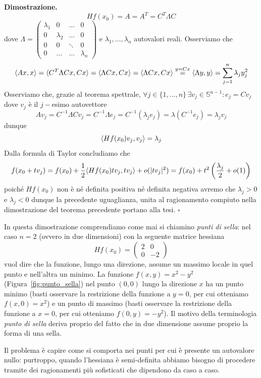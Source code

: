 \noindent \textbf{Dimostrazione. }
$$
Hf(x_0)=A=A^T=C^T \Lambda C
$$
dove $\Lambda = \begin{pmatrix} \lambda_1 & 0 & \ldots & 0 \\
0 & \lambda_2 & \ldots & 0 \\
0 & 0 & \ddots & 0 \\ 0 & \ldots & \ldots & \lambda_n \end{pmatrix}$ e $\lambda_1, \ldots, \lambda_n$ autovalori reali. Osserviamo che
$$
\langle Ax, x \rangle = \langle C^T \Lambda Cx, Cx \rangle = \langle \Lambda Cx, Cx \rangle =  \langle \Lambda Cx, Cx \rangle \stackrel{y=Cx}{=} \langle \Lambda y, y \rangle = \sum_{j=1}^n \lambda_j y_j^2
$$
Osserviamo che, grazie al teorema spettrale, $\forall j \in \{1, \ldots, n \} \, \exists v_j \in \mathbb{S}^{n-1} : e_j = Cv_j$ dove $v_j$ è il $j-$esimo autovettore
$$
Av_j = C^{-1} \Lambda Cv_j = C^{-1} \Lambda e_j = C^{-1} (\lambda_j e_j) = \lambda (C^{-1} e_j) = \lambda_j v_j
$$
dunque
$$
\langle Hf(x_0)v_j, v_j \rangle = \lambda_j
$$
Dalla formula di Taylor concludiamo che
$$
f(x_0 + tv_j) = f(x_0) + \frac{1}{2} \langle Hf(x_0)tv_j, tv_j \rangle + o(|tv_j|^2) = f(x_0) + t^2 \left( \frac{\lambda_j}{2} + o(1) \right)
$$
poiché $Hf(x_0)$ non è né definita positiva né definita negativa avremo che $\lambda_j > 0$ e $\lambda_j < 0$ dunque la precedente uguaglianza, unita al ragionamento compiuto nella dimostrazione del teorema precedente portano alla tesi.
\hfill $\square$

\begin{remark}
In questa dimostrazione comprendiamo come mai si chiamino \emph{punti di sella}: nel caso $n=2$ (ovvero in due dimensioni) con la seguente matrice hessiana
$$
Hf(x_0) = \begin{pmatrix}
2 & 0 \\
0 & -2
\end{pmatrix}
$$
vuol dire che la funzione, lungo una direzione, assume un massimo locale in quel punto e nell'altra un minimo. La funzione $f(x,y)=x^2-y^2$ (Figura~\ref{fig:punto_sella}) nel punto $(0,0)$ lungo la direzione $x$ ha un punto minimo (basti osservare la restrizione della funzione a $y=0$, per cui otteniamo $f(x, 0)=x^2$) e un punto di massimo (basti osservare la restrizione della funzione a $x=0$, per cui otteniamo $f(0, y) = -y^2$). Il motivo della terminologia \emph{punto di sella} deriva proprio del fatto che in due dimensione assume proprio la forma di una sella.
\end{remark}

Il problema è capire come si comporta nei punti per cui è presente un autovalore nullo: purtroppo, quando l'hessiana è semi-definita abbiamo bisogno di procedere tramite dei ragionamenti più sofisticati che dipendono da caso a caso.

